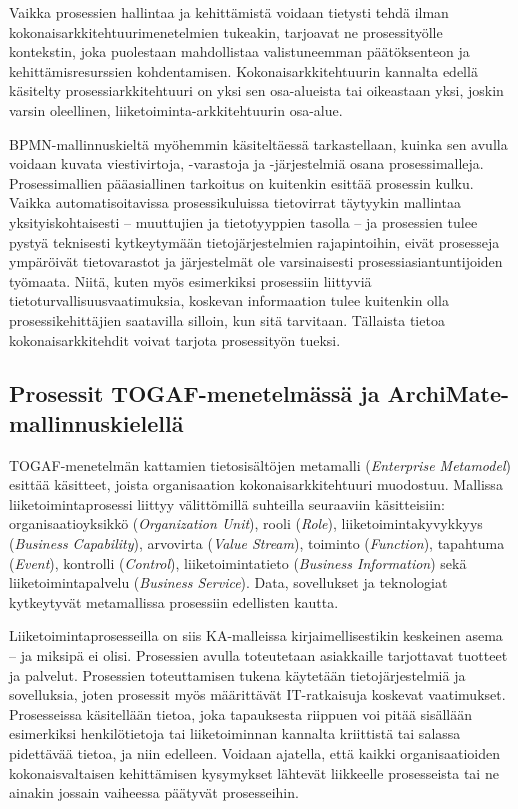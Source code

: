 \documentclass[
  finnish,
  letterpaper,
  DIV=11,
  numbers=noendperiod,
  oneside]{scrreprt}
\begin{document}
Vaikka prosessien hallintaa ja kehittämistä voidaan tietysti tehdä ilman
kokonaisarkkitehtuurimenetelmien tukeakin, tarjoavat ne prosessityölle
kontekstin, joka puolestaan mahdollistaa valistuneemman päätöksenteon ja
kehittämisresurssien kohdentamisen. Kokonaisarkkitehtuurin kannalta
edellä käsitelty prosessiarkkitehtuuri on yksi sen osa-alueista tai
oikeastaan yksi, joskin varsin oleellinen, liiketoiminta-arkkitehtuurin
osa-alue.

BPMN-mallinnuskieltä myöhemmin käsiteltäessä tarkastellaan, kuinka sen
avulla voidaan kuvata viestivirtoja, -varastoja ja -järjestelmiä osana
prosessimalleja. Prosessimallien pääasiallinen tarkoitus on kuitenkin
esittää prosessin kulku. Vaikka automatisoitavissa prosessikuluissa
tietovirrat täytyykin mallintaa yksityiskohtaisesti -- muuttujien ja
tietotyyppien tasolla -- ja prosessien tulee pystyä teknisesti
kytkeytymään tietojärjestelmien rajapintoihin, eivät prosesseja
ympäröivät tietovarastot ja järjestelmät ole varsinaisesti
prosessiasiantuntijoiden työmaata. Niitä, kuten myös esimerkiksi
prosessiin liittyviä tietoturvallisuusvaatimuksia, koskevan informaation
tulee kuitenkin olla prosessikehittäjien saatavilla silloin, kun sitä
tarvitaan. Tällaista tietoa kokonaisarkkitehdit voivat tarjota
prosessityön tueksi.

\subsection{Prosessit TOGAF-menetelmässä ja
ArchiMate-mallinnuskielellä}\label{prosessit-togaf-menetelmuxe4ssuxe4-ja-archimate-mallinnuskielelluxe4}

TOGAF-menetelmän kattamien tietosisältöjen metamalli (\emph{Enterprise
Metamodel})
esittää käsitteet, joista organisaation kokonaisarkkitehtuuri muodostuu.
Mallissa liiketoimintaprosessi liittyy välittömillä suhteilla seuraaviin
käsitteisiin: organisaatioyksikkö (\emph{Organization Unit}), rooli
(\emph{Role}), liiketoimintakyvykkyys (\emph{Business Capability}),
arvovirta (\emph{Value Stream}), toiminto (\emph{Function}), tapahtuma
(\emph{Event}), kontrolli (\emph{Control}), liiketoimintatieto
(\emph{Business Information}) sekä liiketoimintapalvelu (\emph{Business
Service}). Data, sovellukset ja teknologiat kytkeytyvät metamallissa
prosessiin edellisten kautta.

Liiketoimintaprosesseilla on siis KA-malleissa kirjaimellisestikin
keskeinen asema -- ja miksipä ei olisi. Prosessien avulla toteutetaan
asiakkaille tarjottavat tuotteet ja palvelut. Prosessien toteuttamisen
tukena käytetään tietojärjestelmiä ja sovelluksia, joten prosessit myös
määrittävät IT-ratkaisuja koskevat vaatimukset. Prosesseissa käsitellään
tietoa, joka tapauksesta riippuen voi pitää sisällään esimerkiksi
henkilötietoja tai liiketoiminnan kannalta kriittistä tai salassa
pidettävää tietoa, ja niin edelleen. Voidaan ajatella, että kaikki
organisaatioiden kokonaisvaltaisen kehittämisen kysymykset lähtevät
liikkeelle prosesseista tai ne ainakin jossain vaiheessa päätyvät
prosesseihin.
\end{document}

